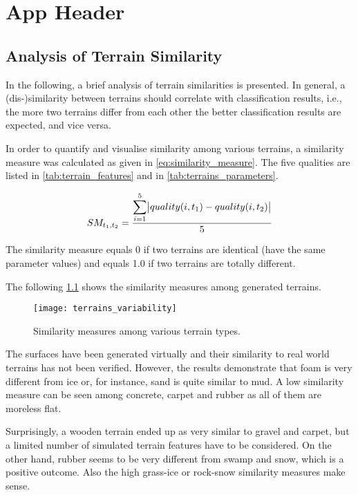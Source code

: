 \chapter{App Header} \label{app:detailed_results}

\section{Analysis of Terrain Similarity} \label{sec:terrains_analysis}
In the following, a brief analysis of terrain similarities is presented. In general, a (dis-)similarity between terrains should correlate with classification results, i.e., the more two terrains differ from each other the better classification results are expected, and vice versa.

In order to quantify and visualise similarity among various terrains, a similarity measure was calculated as given in \cref{eq:similarity_measure}. The five qualities are listed in \cref{tab:terrain_features} and in \cref{tab:terrains_parameters}.

\begin{align} \label{eq:similarity_measure}
  SM_{t_1, t_2} = \frac{\displaystyle\sum_{i=1}^{5} \abs{quality(i, t_1) - quality(i, t_2)}}{5}
\end{align} 

The similarity measure equals 0 if two terrains are identical (have the same parameter values) and equals 1.0 if two terrains are totally different.

The following \cref{fig:terrain_similarity_measures} shows the similarity measures among generated terrains.

\begin{figure}[H]
  \centering
  \texttt{[image: terrains\_variability]}
  \caption{Similarity measures among various terrain types.}
  \label{fig:terrain_similarity_measures}
\end{figure}

The surfaces have been generated virtually and their similarity to real world terrains has not been verified. However, the results demonstrate that foam is very different from ice or, for instance, sand is quite similar to mud. A low similarity measure can be seen among concrete, carpet and rubber as all of them are moreless flat.

Surprisingly, a wooden terrain ended up as very similar to gravel and carpet, but a limited number of simulated terrain features have to be considered. 
On the other hand, rubber seems to be very different from swamp and snow, which is a positive outcome. Also the high grass-ice or rock-snow similarity measures make sense. 

